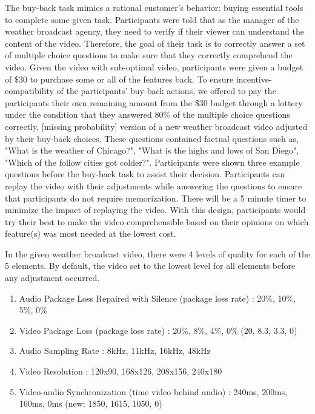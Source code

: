 The buy-back task mimics a rational customer's behavior: 
buying essential tools to complete some given task.
Participants were told that 
as the manager of the weather broadcast agency,
they need to verify if their viewer 
can understand the content of the video.
Therefore, the goal of their task 
is to correctly answer a set of multiple choice questions
to make sure that they correctly comprehend the video.
Given the video with sub-optimal video, 
participants were given a budget of \$30 
to purchase some or all of the features back.
To ensure incentive-compatibility 
of the participants' buy-back actions, 
we offered to pay the participants their own remaining amount 
from the \$30 budget through a lottery 
under the condition that 
they answered 80\% of the multiple choice questions correctly,
[missing probability]
version of a new weather broadcast video 
adjusted by their buy-back choices. 
These questions contained factual questions such as, 
"What is the weather of Chicago?", 
"What is the highs and lows of San Diego", 
"Which of the follow cities got colder?". 
Participants were shown three example questions 
before the buy-back task to assist their decision.
Participants can replay the video with their adjustments
while answering the questions
to ensure that participants do not require memorization.
There will be a 5 minute timer to minimize the impact of replaying the video.
With this design, 
participants would try their best to make the video comprehensible 
based on their opinions on which feature(s) was most needed 
at the lowest cost.\par

In the given weather broadcast video, 
there were 4 levels of quality for each of the 5 elements. 
By default, the video set to the lowest level 
for all elements before any adjustment occurred. 

\begin{enumerate}
    \item Audio Package Loss Repaired with Silence (package loss rate) \cite{watson1996evaluating}: 20\%, 10\%, 5\%, 0\%
    \item Video Package Loss (package loss rate) \cite{claypool1999effects}: 20\%, 8\%, 4\%, 0\% (20, 8.3, 3.3, 0) 
    \item Audio Sampling Rate \cite{oeldorf2012bad, noll1993wideband}: 8kHz, 11kHz, 16kHz, 48kHz
    \item Video Resolution \cite{oeldorf2012bad, knoche2008low}: 120x90, 168x126, 208x156, 240x180
    \item Video-audio Synchronization (time video behind audio) \cite{steinmetz1996human}: 240ms, 200ms, 160ms, 0ms (new: 1850, 1615, 1050, 0)
\end{enumerate}

